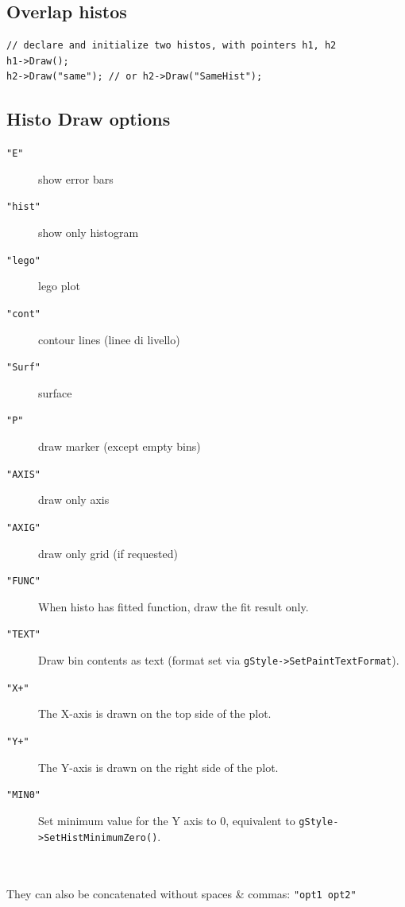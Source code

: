 \documentclass[10pt, twoside]{article}
\newcommand{\ttt}[1]{\colorbox{boxgray}{\texttt{#1}}}
\begin{document}
\subsection{Overlap histos}
\begin{verbatim}
// declare and initialize two histos, with pointers h1, h2
h1->Draw();
h2->Draw("same"); // or h2->Draw("SameHist");
\end{verbatim}

\subsection{Histo Draw options}
\begin{description}
\item[\ttt{"E"}] show error bars
\item[\ttt{"hist"}] show only histogram
\item[\ttt{"lego"}] lego plot
\item[\ttt{"cont"}] contour lines (linee di livello)
\item[\ttt{"Surf"}] surface
\item[\ttt{"P"}] draw marker (except empty bins)
\item[\ttt{"AXIS"}] draw only axis
\item[\ttt{"AXIG"}] draw only grid (if requested)
\item[\ttt{"FUNC"}]	When histo has fitted function, draw the fit result only.
\item[\ttt{"TEXT"}]	Draw bin contents as text (format set via 
\ttt{gStyle->SetPaintTextFormat}).
\item[\ttt{"X+"}]	The X-axis is drawn on the top side of the plot.
\item[\ttt{"Y+"}]	The Y-axis is drawn on the right side of the plot.
\item[\ttt{"MIN0"}] Set minimum value for the Y axis to $0$, equivalent to \ttt{gStyle->SetHistMinimumZero()}.
\end{description}
\\~\\They can also be concatenated without spaces \& commas: \ttt{"opt1 opt2"}
\end{document}
